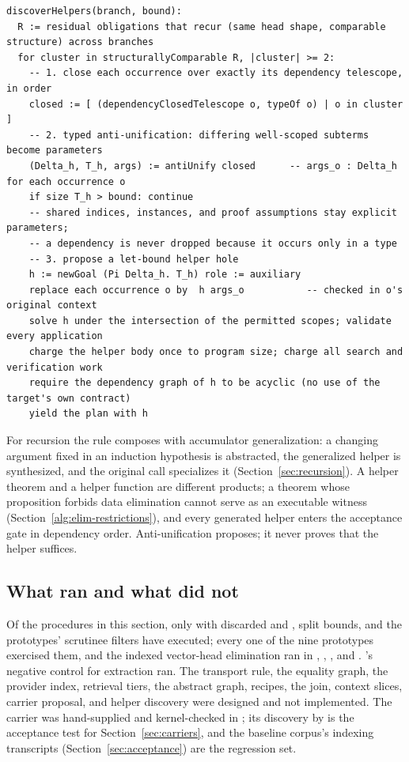\begin{lstlisting}
discoverHelpers(branch, bound):
  R := residual obligations that recur (same head shape, comparable structure) across branches
  for cluster in structurallyComparable R, |cluster| >= 2:
    -- 1. close each occurrence over exactly its dependency telescope, in order
    closed := [ (dependencyClosedTelescope o, typeOf o) | o in cluster ]
    -- 2. typed anti-unification: differing well-scoped subterms become parameters
    (Delta_h, T_h, args) := antiUnify closed      -- args_o : Delta_h  for each occurrence o
    if size T_h > bound: continue
    -- shared indices, instances, and proof assumptions stay explicit parameters;
    -- a dependency is never dropped because it occurs only in a type
    -- 3. propose a let-bound helper hole
    h := newGoal (Pi Delta_h. T_h) role := auxiliary
    replace each occurrence o by  h args_o           -- checked in o's original context
    solve h under the intersection of the permitted scopes; validate every application
    charge the helper body once to program size; charge all search and verification work
    require the dependency graph of h to be acyclic (no use of the target's own contract)
    yield the plan with h
\end{lstlisting}

For recursion the rule composes with accumulator generalization: a changing argument fixed in an induction hypothesis is abstracted, the generalized helper is synthesized, and the original call specializes it (Section~\ref{sec:recursion}). A helper theorem and a helper function are different products; a theorem whose proposition forbids data elimination cannot serve as an executable witness (Section~\ref{alg:elim-restrictions}), and every generated helper enters the acceptance gate in dependency order. Anti-unification proposes; it never proves that the helper suffices.

\subsection{What ran and what did not}

Of the procedures in this section, only  with discarded  and , split bounds, and the prototypes' scrutinee filters have executed; every one of the nine prototypes exercised them, and the indexed vector-head elimination ran in , , , and . 's negative control for  extraction ran. The transport rule, the equality graph, the provider index, retrieval tiers, the abstract graph, recipes, the join, context slices, carrier proposal, and helper discovery were designed and not implemented. The  carrier was hand-supplied and kernel-checked in ; its discovery by  is the acceptance test for Section~\ref{sec:carriers}, and the baseline corpus's indexing transcripts (Section~\ref{sec:acceptance}) are the regression set.
